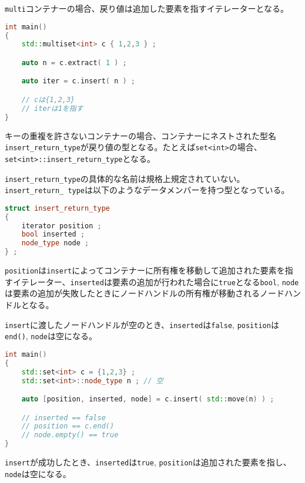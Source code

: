 \lstinline!multi!コンテナーの場合、戻り値は追加した要素を指すイテレーターとなる。

\begin{lstlisting}[language=C++]
int main()
{
    std::multiset<int> c { 1,2,3 } ;

    auto n = c.extract( 1 ) ;

    auto iter = c.insert( n ) ;

    // cは{1,2,3}
    // iterは1を指す
}
\end{lstlisting}

キーの重複を許さないコンテナーの場合、コンテナーにネストされた型名\lstinline!insert_return_type!が戻り値の型となる。たとえば\lstinline!set<int>!の場合、\lstinline!set<int>::insert_return_type!となる。

\lstinline!insert_return_type!の具体的な名前は規格上規定されていない。\lstinline[breaklines=true]!insert_return_ type!は以下のようなデータメンバーを持つ型となっている。

\begin{lstlisting}[language=C++]
struct insert_return_type
{
    iterator position ;
    bool inserted ;
    node_type node ;
} ;
\end{lstlisting}

\lstinline!position!は\lstinline!insert!によってコンテナーに所有権を移動して追加された要素を指すイテレーター、\lstinline!inserted!は要素の追加が行われた場合に\lstinline!true!となる\lstinline!bool!,
\lstinline!node!は要素の追加が失敗したときにノードハンドルの所有権が移動されるノードハンドルとなる。

\lstinline!insert!に渡したノードハンドルが空のとき、\lstinline!inserted!は\lstinline!false!,
\lstinline!position!は\lstinline!end()!, \lstinline!node!は空になる。

\begin{lstlisting}[language=C++]
int main()
{
    std::set<int> c = {1,2,3} ;
    std::set<int>::node_type n ; // 空

    auto [position, inserted, node] = c.insert( std::move(n) ) ;

    // inserted == false
    // position == c.end()
    // node.empty() == true
}
\end{lstlisting}

\lstinline!insert!が成功したとき、\lstinline!inserted!は\lstinline!true!,
\lstinline!position!は追加された要素を指し、\lstinline!node!は空になる。

